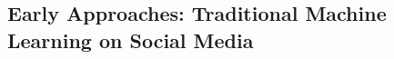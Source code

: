 \documentclass{article}
\begin{document}












\subsection{Early Approaches: Traditional Machine Learning on Social Media}








\end{document}

